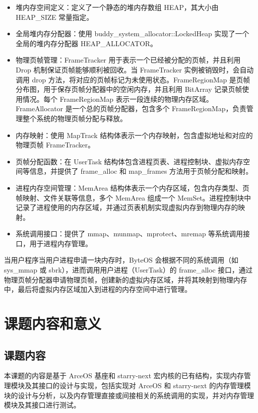 \begin{itemize}
\item 堆内存空间定义：定义了一个静态的堆内存数组 HEAP，其大小由 HEAP\_SIZE 常量指定。
\item 全局堆内存分配器：使用 buddy\_system\_allocator::LockedHeap 实现了一个全局的堆内存分配器 HEAP\_ALLOCATOR。
\item 物理页帧管理：FrameTracker 用于表示一个已经被分配的页帧，并且利用 Drop 机制保证页帧能够顺利被回收。当 FrameTracker 实例被销毁时，会自动调用 drop 方法，将对应的页帧标记为未使用状态。FrameRegionMap 是页帧分布图，用于保存页帧分配器中的空闲内存，并且利用 BitArray 记录页帧使用情况。每个 FrameRegionMap 表示一段连续的物理内存区域。FrameAllocator 是一个总的页帧分配器，包含多个 FrameRegionMap，负责管理整个系统的物理页帧分配与释放。
\item 内存映射：使用 MapTrack 结构体表示一个内存映射，包含虚拟地址和对应的物理页帧 FrameTracker。
\item 页帧分配函数：在 UserTask 结构体包含进程页表、进程控制块、虚拟内存空间等信息，并提供了 frame\_alloc 和 map\_frames 方法用于页帧分配和映射。
\item 进程内存空间管理：MemArea 结构体表示一个内存区域，包含内存类型、页帧映射、文件关联等信息，多个 MemArea 组成一个 MemSet。进程控制块中记录了进程使用的内存区域，并通过页表机制实现虚拟内存到物理内存的映射。
\item 系统调用接口：提供了 mmap、munmap、mprotect、mremap 等系统调用接口，用于进程内存管理。
\end{itemize}

当用户程序当用户进程申请一块内存时，ByteOS 会根据不同的系统调用（如 sys\_mmap 或 sbrk），进而调用用户进程（UserTask）的 frame\_alloc 接口，通过物理页帧分配器申请物理页帧，创建新的虚拟内存区域，并将其映射到物理内存中，最后将虚拟内存区域加入到进程的内存空间中进行管理。

\section{课题内容和意义}

\subsection{课题内容}

本课题的内容是基于 ArceOS 基座和 starry-next 宏内核的已有结构，实现内存管理模块及其接口的设计与实现，包括实现对 ArceOS 和 starry-next 的内存管理模块的设计与分析，以及内存管理直接或间接相关的系统调用的实现，并对内存管理模块及其接口进行测试。


